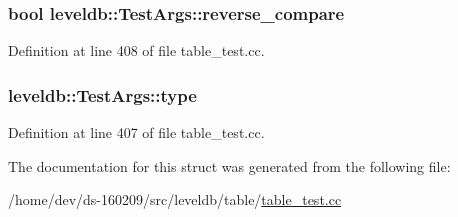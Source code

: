 \subsubsection[{reverse\+\_\+compare}]{\setlength{\rightskip}{0pt plus 5cm}bool leveldb\+::\+Test\+Args\+::reverse\+\_\+compare}\label{structleveldb_1_1_test_args_ab4c8bef944a4ddf845378f1fce2b6c22}


Definition at line 408 of file table\+\_\+test.\+cc.

\hypertarget{structleveldb_1_1_test_args_a1c2c14e2506bf6c238a2685c38eb16ac}{}
\subsubsection[{type}]{ leveldb\+::\+Test\+Args\+::type}\label{structleveldb_1_1_test_args_a1c2c14e2506bf6c238a2685c38eb16ac}


Definition at line 407 of file table\+\_\+test.\+cc.



The documentation for this struct was generated from the following file\+:\begin{DoxyCompactItemize}
\item 
/home/dev/ds-\/160209/src/leveldb/table/\hyperlink{table__test_8cc}{table\+\_\+test.\+cc}\end{DoxyCompactItemize}
